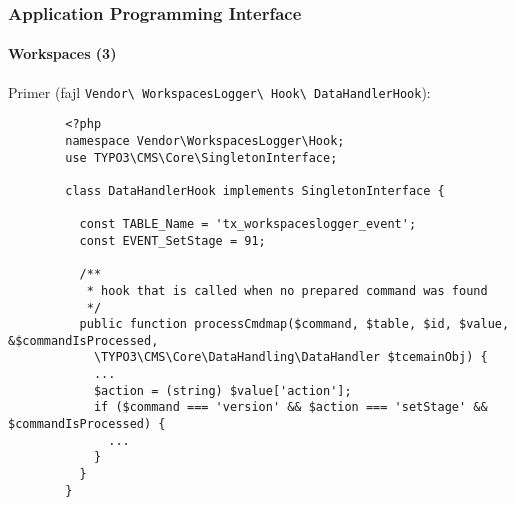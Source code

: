 
\begin{frame}[fragile]
	\frametitle{Application Programming Interface}
	\framesubtitle{Workspaces (3)}

	Primer (fajl \texttt{Vendor\textbackslash
		WorkspacesLogger\textbackslash
		Hook\textbackslash
		DataHandlerHook}):

	\lstset{
		basicstyle=\tiny\ttfamily
	}

	\begin{lstlisting}
		<?php
		namespace Vendor\WorkspacesLogger\Hook;
		use TYPO3\CMS\Core\SingletonInterface;

		class DataHandlerHook implements SingletonInterface {

		  const TABLE_Name = 'tx_workspaceslogger_event';
		  const EVENT_SetStage = 91;

		  /**
		   * hook that is called when no prepared command was found
		   */
		  public function processCmdmap($command, $table, $id, $value, &$commandIsProcessed,
		    \TYPO3\CMS\Core\DataHandling\DataHandler $tcemainObj) {
		    ...
		    $action = (string) $value['action'];
		    if ($command === 'version' && $action === 'setStage' && $commandIsProcessed) {
		      ...
		    }
		  }
		}
	\end{lstlisting}

\end{frame}


